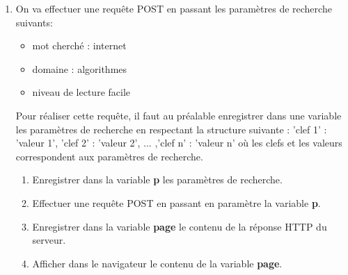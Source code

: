 \documentclass[11pt,a4paper]{article}
\begin{document}
\begin{enumerate}
\item On va effectuer une requête POST en passant les paramètres de recherche suivants:
\begin{itemize}
\item mot cherché : internet
\item domaine : algorithmes
\item niveau de lecture facile
\end{itemize}
Pour réaliser cette requête, il faut au préalable enregistrer dans une variable les paramètres de recherche en respectant la structure suivante : {'clef 1' : 'valeur 1', 'clef 2' : 'valeur 2', ... ,'clef n' : 'valeur n'} où les clefs et les valeurs correspondent aux paramètres de recherche.
\begin{enumerate}
\item Enregistrer dans la variable \textbf{p} les paramètres de recherche.
\item Effectuer une requête POST en passant en paramètre la variable \textbf{p}.
\item Enregistrer dans la variable \textbf{page} le contenu de la réponse HTTP du serveur.
\item Afficher dans le navigateur le contenu de la variable \textbf{page}.
\end{enumerate}
\end{enumerate}
\end{document}
